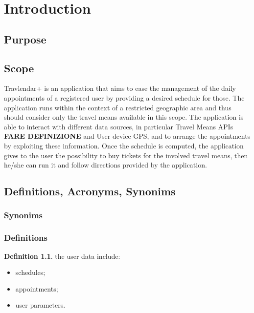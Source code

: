 \chapter{Introduction}

\section{Purpose}

\section{Scope}

Travlendar+ is an application that aims to ease the management of the daily appointments of a registered user by providing a desired schedule for those. 
The application runs within the context of a restricted geographic area and thus should consider only the travel means available in this scope.
The application is able to interact with different data sources, in particular Travel Means APIs \textbf{FARE DEFINIZIONE} and User device GPS, and to arrange the appointments by exploiting these information.
Once the schedule is computed, the application gives to the user the possibility to buy tickets for the involved travel means, then he/she can run it and follow directions provided by the application. 

\section{Definitions, Acronyms, Synonims}

\subsection{Synonims}

\subsection{Definitions}
\theoremstyle{definition}
\newtheorem{definition}{Definition}[section]
 
\begin{definition} \label{def:userdata}
the user data include:
\begin{itemize}
\item schedules;
\item appointments;
\item user parameters.
\end{itemize}

\end{definition}
  
